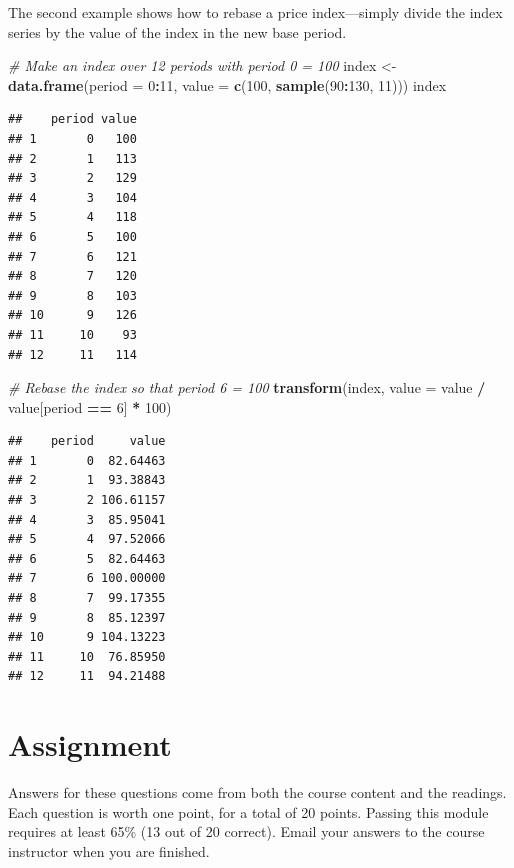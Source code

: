 \documentclass[]{article}
\newenvironment{Shaded}{\begin{snugshade}}{\end{snugshade}}
\newcommand{\CommentTok}[1]{\textcolor[rgb]{0.56,0.35,0.01}{\textit{#1}}}
\newcommand{\DataTypeTok}[1]{\textcolor[rgb]{0.13,0.29,0.53}{#1}}
\newcommand{\DecValTok}[1]{\textcolor[rgb]{0.00,0.00,0.81}{#1}}
\newcommand{\KeywordTok}[1]{\textcolor[rgb]{0.13,0.29,0.53}{\textbf{#1}}}
\newcommand{\NormalTok}[1]{#1}
\newcommand{\OperatorTok}[1]{\textcolor[rgb]{0.81,0.36,0.00}{\textbf{#1}}}
\newcommand{\StringTok}[1]{\textcolor[rgb]{0.31,0.60,0.02}{#1}}
\begin{document}
The second example shows how to rebase a price index---simply divide the index series by the value of the index in the new base period.

\begin{Shaded}
\begin{Highlighting}[]
\CommentTok{# Make an index over 12 periods with period 0 = 100}
\NormalTok{index <-}\StringTok{ }\KeywordTok{data.frame}\NormalTok{(}\DataTypeTok{period =} \DecValTok{0}\OperatorTok{:}\DecValTok{11}\NormalTok{, }\DataTypeTok{value =} \KeywordTok{c}\NormalTok{(}\DecValTok{100}\NormalTok{, }\KeywordTok{sample}\NormalTok{(}\DecValTok{90}\OperatorTok{:}\DecValTok{130}\NormalTok{, }\DecValTok{11}\NormalTok{)))}
\NormalTok{index}
\end{Highlighting}
\end{Shaded}

\begin{verbatim}
##    period value
## 1       0   100
## 2       1   113
## 3       2   129
## 4       3   104
## 5       4   118
## 6       5   100
## 7       6   121
## 8       7   120
## 9       8   103
## 10      9   126
## 11     10    93
## 12     11   114
\end{verbatim}

\begin{Shaded}
\begin{Highlighting}[]
\CommentTok{# Rebase the index so that period 6 = 100}
\KeywordTok{transform}\NormalTok{(index, }\DataTypeTok{value =}\NormalTok{ value }\OperatorTok{/}\StringTok{ }\NormalTok{value[period }\OperatorTok{==}\StringTok{ }\DecValTok{6}\NormalTok{] }\OperatorTok{*}\StringTok{ }\DecValTok{100}\NormalTok{)}
\end{Highlighting}
\end{Shaded}

\begin{verbatim}
##    period     value
## 1       0  82.64463
## 2       1  93.38843
## 3       2 106.61157
## 4       3  85.95041
## 5       4  97.52066
## 6       5  82.64463
## 7       6 100.00000
## 8       7  99.17355
## 9       8  85.12397
## 10      9 104.13223
## 11     10  76.85950
## 12     11  94.21488
\end{verbatim}

\hypertarget{assignment}{%
\section{Assignment}\label{assignment}}

Answers for these questions come from both the course content and the readings. Each question is worth one point, for a total of 20 points. Passing this module requires at least 65\% (13 out of 20 correct). Email your answers to the course instructor when you are finished.
\end{document}
